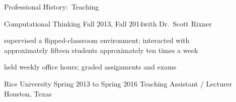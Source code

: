 \documentclass{resume}
\begin{document}
\begin{rSection}{Professional History:~Teaching}
{    \begin{UnivDeptItem}{Computational Thinking}
    {Fall 2013, Fall 2014}{with Dr.~Scott Rixner}{}
    \item supervised a flipped-classroom environment; interacted with \\
    approximately fifteen students approximately ten times a week
    \item held weekly office hours; graded assignments and exams
    \end{UnivDeptItem}

  }{
    \EventWithSubtitle
    {Rice University}
    {Spring 2013 to Spring 2016}
    {Teaching Assistant / Lecturer}
    {Houston, Texas}%
  }

\end{rSection}

  


\end{document}
